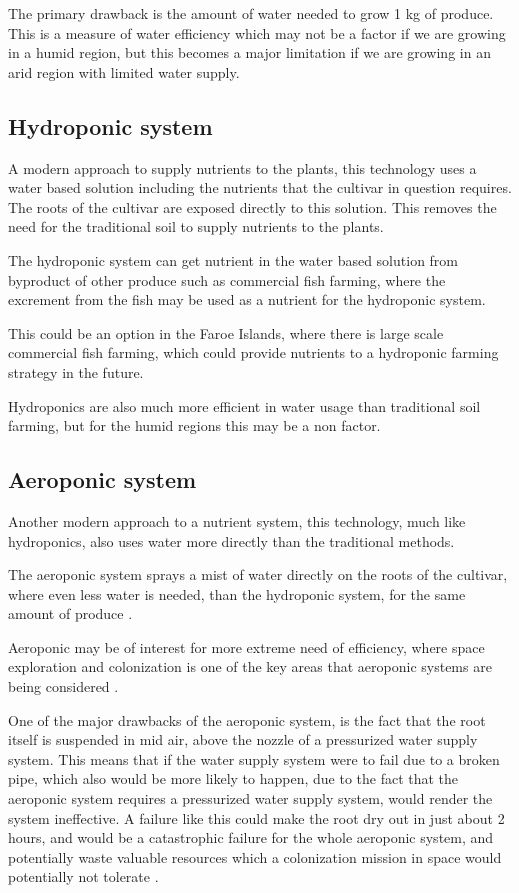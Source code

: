 \documentclass[a4paper,12pt,twoside,openright,titlepage]{book}
\begin{document}
The primary drawback is the amount of water needed to grow 1 kg of produce. This is a measure of water efficiency which may not be a factor if we are growing in a humid region, but this becomes a major limitation if we are growing in an arid region with limited water supply.

\subsection{Hydroponic system}
A modern approach to supply nutrients to the plants, this technology uses a water based solution including the nutrients that the cultivar in question requires.
The roots of the cultivar are exposed directly to this solution.
This removes the need for the traditional soil to supply nutrients to the plants.

The hydroponic system can get nutrient in the water based solution from byproduct of other produce such as commercial fish farming, where the excrement from the fish may be used as a nutrient for the hydroponic system.

This could be an option in the Faroe Islands, where there is large scale commercial fish farming, which could provide nutrients to a hydroponic farming strategy in the future.

Hydroponics are also much more efficient in water usage than traditional soil farming, but for the humid regions this may be a non factor.

\subsection{Aeroponic system}
Another modern approach to a nutrient system, this technology, much like hydroponics, also uses water more directly than the traditional methods.

The aeroponic system sprays a mist of water directly on the roots of the cultivar, where even less water is needed, than the hydroponic system, for the same amount of produce \cite{aeroponic2}.

Aeroponic may be of interest for more extreme need of efficiency, where space exploration and colonization is one of the key areas that aeroponic systems are being considered \cite{mars_agriculture}.

One of the major drawbacks of the aeroponic system, is the fact that the root itself is suspended in mid air, above the nozzle of a pressurized water supply system. This means that if the water supply system were to fail due to a broken pipe, which also would be more likely to happen, due to the fact that the aeroponic system requires a pressurized water supply system, would render the system ineffective. A failure like this could make the root dry out in just about 2 hours, and would be a catastrophic failure for the whole aeroponic system, and potentially waste valuable resources which a colonization mission in space would potentially not tolerate \cite{mars_agriculture}.
\end{document}
